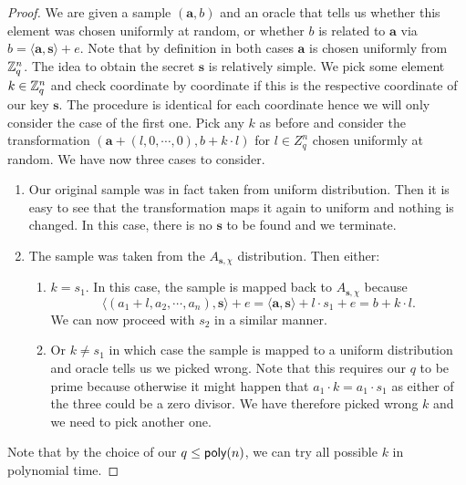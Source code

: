\begin{proof}
        We are given a sample $(\bm{a}, b)$ and an oracle that tells us whether this element was chosen uniformly at random, or whether $b$ is related to $\bm{a}$ via $b = \langle \bm{a}, \bm{s} \rangle + e$. Note that by definition in both cases $\bm{a}$ is chosen uniformly from $\mathbb{Z}_q^n$. The idea to obtain the secret $\bm{s}$ is relatively simple. We pick some element $k \in \mathbb{Z}_q^n$ and check coordinate by coordinate if this is the respective coordinate of our key $\bm{s}$. The procedure is identical for each coordinate hence we will only consider the case of the first one. Pick any $k$ as before and consider the transformation $(\bm{a} + (l, 0, \cdots, 0), b +k \cdot l)$ for $l\in Z_q^n$ chosen uniformly at random. We have now three cases to consider.
        \begin{enumerate}
                \item Our original sample was in fact taken from uniform distribution. Then it is easy to see that the transformation maps it again to uniform and nothing is changed. In this case, there is no $\bm{s}$ to be found and we terminate.
                \item The sample was taken from the $A_{\bm{s}, \chi}$ distribution. Then either:
                        \begin{enumerate}
                                \item $k = s_1$. In this case, the sample is mapped back to $A_{\bm{s}, \chi}$ because \[ \langle (a_1 + l, a_2, \cdots, a_n), \bm{s} \rangle + e = \langle \bm{a}, \bm{s} \rangle + l \cdot s_1 + e = b + k \cdot l.\] We can now proceed with $s_2$ in a similar manner.
                                \item Or $k \neq s_1$ in which case the sample is mapped to a uniform distribution and oracle tells us we picked wrong. Note that this requires our $q$ to be prime because otherwise it might happen that $a_1 \cdot k = a_1 \cdot s_1$ as either of the three could be a zero divisor. We have therefore picked wrong $k$ and we need to pick another one.
                        \end{enumerate}
        \end{enumerate}
        Note that by the choice of our $q \leq \textsf{poly}(n)$, we can try all possible $k$ in polynomial time.
\end{proof}


